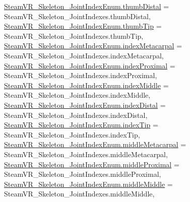 \begin{DoxyCompactItemize}
\mbox{\hyperlink{namespace_valve_1_1_v_r_a99f7cc968994699a7485078bafddac17ab17d1240e4ca5429e8eca6437baad964}{Steam\+V\+R\+\_\+\+Skeleton\+\_\+\+Joint\+Index\+Enum.\+thumb\+Distal}} = Steam\+V\+R\+\_\+\+Skeleton\+\_\+\+Joint\+Indexes.\+thumb\+Distal, 
\mbox{\hyperlink{namespace_valve_1_1_v_r_a99f7cc968994699a7485078bafddac17adaeaa4568171eb6656917f9f26ce1c5c}{Steam\+V\+R\+\_\+\+Skeleton\+\_\+\+Joint\+Index\+Enum.\+thumb\+Tip}} = Steam\+V\+R\+\_\+\+Skeleton\+\_\+\+Joint\+Indexes.\+thumb\+Tip, 
\mbox{\hyperlink{namespace_valve_1_1_v_r_a99f7cc968994699a7485078bafddac17a745664bc6e3ef1b16358ca25ab83f705}{Steam\+V\+R\+\_\+\+Skeleton\+\_\+\+Joint\+Index\+Enum.\+index\+Metacarpal}} = Steam\+V\+R\+\_\+\+Skeleton\+\_\+\+Joint\+Indexes.\+index\+Metacarpal, 
\newline
\mbox{\hyperlink{namespace_valve_1_1_v_r_a99f7cc968994699a7485078bafddac17aa66c7de414d13a1a68addf27b5837606}{Steam\+V\+R\+\_\+\+Skeleton\+\_\+\+Joint\+Index\+Enum.\+index\+Proximal}} = Steam\+V\+R\+\_\+\+Skeleton\+\_\+\+Joint\+Indexes.\+index\+Proximal, 
\mbox{\hyperlink{namespace_valve_1_1_v_r_a99f7cc968994699a7485078bafddac17a33da99a31b919de6191bc93fc628c1f0}{Steam\+V\+R\+\_\+\+Skeleton\+\_\+\+Joint\+Index\+Enum.\+index\+Middle}} = Steam\+V\+R\+\_\+\+Skeleton\+\_\+\+Joint\+Indexes.\+index\+Middle, 
\mbox{\hyperlink{namespace_valve_1_1_v_r_a99f7cc968994699a7485078bafddac17aa9e932acd04e7ba2816310a0b8e0544c}{Steam\+V\+R\+\_\+\+Skeleton\+\_\+\+Joint\+Index\+Enum.\+index\+Distal}} = Steam\+V\+R\+\_\+\+Skeleton\+\_\+\+Joint\+Indexes.\+index\+Distal, 
\mbox{\hyperlink{namespace_valve_1_1_v_r_a99f7cc968994699a7485078bafddac17afff4b1bc9444941114a424298cd59033}{Steam\+V\+R\+\_\+\+Skeleton\+\_\+\+Joint\+Index\+Enum.\+index\+Tip}} = Steam\+V\+R\+\_\+\+Skeleton\+\_\+\+Joint\+Indexes.\+index\+Tip, 
\newline
\mbox{\hyperlink{namespace_valve_1_1_v_r_a99f7cc968994699a7485078bafddac17a8571e06e7c5361216bda36300e0564ce}{Steam\+V\+R\+\_\+\+Skeleton\+\_\+\+Joint\+Index\+Enum.\+middle\+Metacarpal}} = Steam\+V\+R\+\_\+\+Skeleton\+\_\+\+Joint\+Indexes.\+middle\+Metacarpal, 
\mbox{\hyperlink{namespace_valve_1_1_v_r_a99f7cc968994699a7485078bafddac17a0e74c5551af7d1472b109fc304e60f9e}{Steam\+V\+R\+\_\+\+Skeleton\+\_\+\+Joint\+Index\+Enum.\+middle\+Proximal}} = Steam\+V\+R\+\_\+\+Skeleton\+\_\+\+Joint\+Indexes.\+middle\+Proximal, 
\mbox{\hyperlink{namespace_valve_1_1_v_r_a99f7cc968994699a7485078bafddac17a3dbf4b693b2b42e1996da2a2036cd4a4}{Steam\+V\+R\+\_\+\+Skeleton\+\_\+\+Joint\+Index\+Enum.\+middle\+Middle}} = Steam\+V\+R\+\_\+\+Skeleton\+\_\+\+Joint\+Indexes.\+middle\+Middle, 

\end{DoxyCompactItemize}
